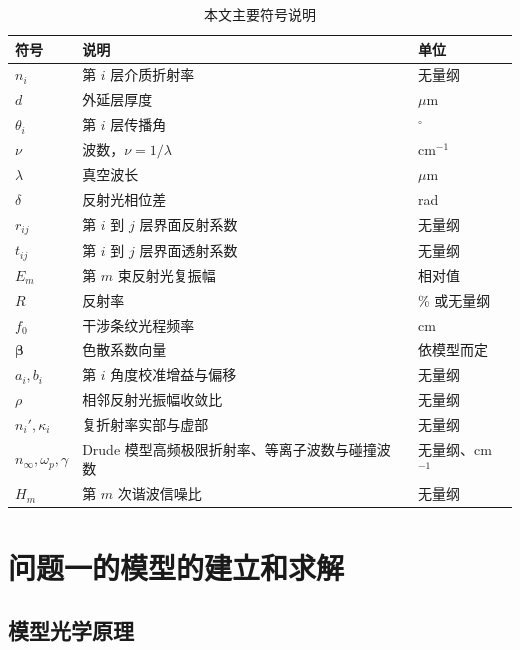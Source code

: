 \documentclass[withoutpreface,bwprint]{cumcmthesis}
\begin{document}
\begin{table}[H]
    \centering
    \caption{本文主要符号说明}
    \label{tab:symbols}
    \begin{tabularx}{\textwidth}{>{\centering\arraybackslash}X>{\centering\arraybackslash}X>{\centering\arraybackslash}X}
        \toprule
        符号 & 说明 & 单位 \\
        \midrule
        $n_i$ & 第 $i$ 层介质折射率 & 无量纲 \\
        $d$ & 外延层厚度 & $\mu$m \\
        $\theta_i$ & 第 $i$ 层传播角 & $^{\circ}$ \\
        $\nu$ & 波数，$\nu=1/\lambda$ & cm$^{-1}$ \\
        $\lambda$ & 真空波长 & $\mu$m \\
        $\delta$ & 反射光相位差 & rad \\
        $r_{ij}$ & 第 $i$ 到 $j$ 层界面反射系数 & 无量纲 \\
        $t_{ij}$ & 第 $i$ 到 $j$ 层界面透射系数 & 无量纲 \\
        $E_m$ & 第 $m$ 束反射光复振幅 & 相对值 \\
        $R$ & 反射率 & \% 或无量纲 \\
        $f_0$ & 干涉条纹光程频率 & cm \\
        $\boldsymbol{\beta}$ & 色散系数向量 & 依模型而定 \\
        $a_i, b_i$ & 第 $i$ 角度校准增益与偏移 & 无量纲 \\
        $\rho$ & 相邻反射光振幅收敛比 & 无量纲 \\
        $n_i', \kappa_i$ & 复折射率实部与虚部 & 无量纲 \\
        $n_\infty, \omega_p, \gamma$ & Drude 模型高频极限折射率、等离子波数与碰撞波数 & 无量纲、cm$^{-1}$ \\
        $H_m$ & 第 $m$ 次谐波信噪比 & 无量纲 \\
        \bottomrule
    \end{tabularx}
\end{table}



\section{问题一的模型的建立和求解}

\subsection{模型光学原理}
\end{document}
